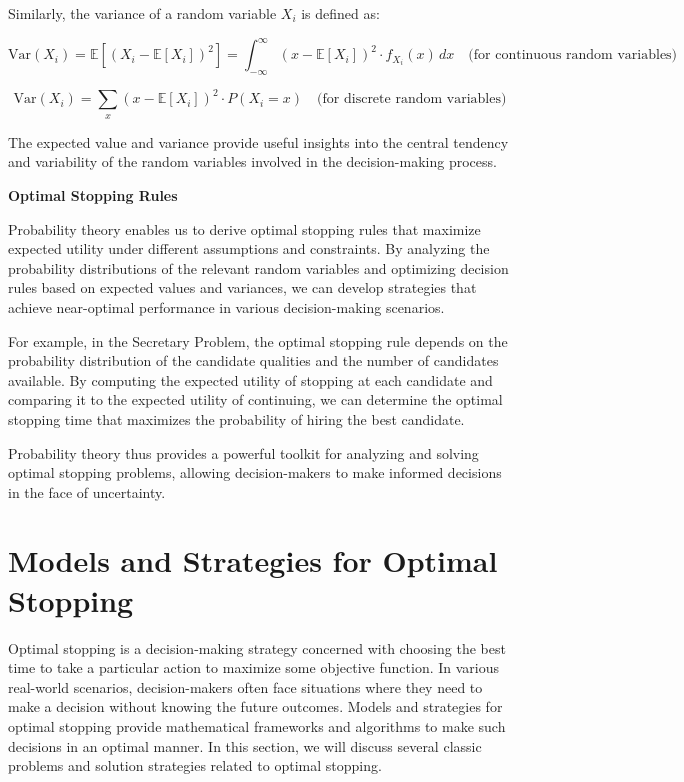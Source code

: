 \documentclass[12pt]{book} %
\begin{document}
Similarly, the variance of a random variable $X_i$ is defined as:

\begin{equation*}
    \text{Var}(X_i) = \mathbb{E}[(X_i - \mathbb{E}[X_i])^2] = \int_{-\infty}^{\infty} (x - \mathbb{E}[X_i])^2 \cdot f_{X_i}(x) \, dx \quad \text{(for continuous random variables)}
\end{equation*}

\begin{equation*}
    \text{Var}(X_i) = \sum_{x} (x - \mathbb{E}[X_i])^2 \cdot P(X_i = x) \quad \text{(for discrete random variables)}
\end{equation*}

The expected value and variance provide useful insights into the central tendency and variability of the random variables involved in the decision-making process.

\textbf{Optimal Stopping Rules}

Probability theory enables us to derive optimal stopping rules that maximize expected utility under different assumptions and constraints. By analyzing the probability distributions of the relevant random variables and optimizing decision rules based on expected values and variances, we can develop strategies that achieve near-optimal performance in various decision-making scenarios.

For example, in the Secretary Problem, the optimal stopping rule depends on the probability distribution of the candidate qualities and the number of candidates available. By computing the expected utility of stopping at each candidate and comparing it to the expected utility of continuing, we can determine the optimal stopping time that maximizes the probability of hiring the best candidate.

Probability theory thus provides a powerful toolkit for analyzing and solving optimal stopping problems, allowing decision-makers to make informed decisions in the face of uncertainty.

\section{Models and Strategies for Optimal Stopping}
Optimal stopping is a decision-making strategy concerned with choosing the best time to take a particular action to maximize some objective function. In various real-world scenarios, decision-makers often face situations where they need to make a decision without knowing the future outcomes. Models and strategies for optimal stopping provide mathematical frameworks and algorithms to make such decisions in an optimal manner. In this section, we will discuss several classic problems and solution strategies related to optimal stopping.
\end{document}
